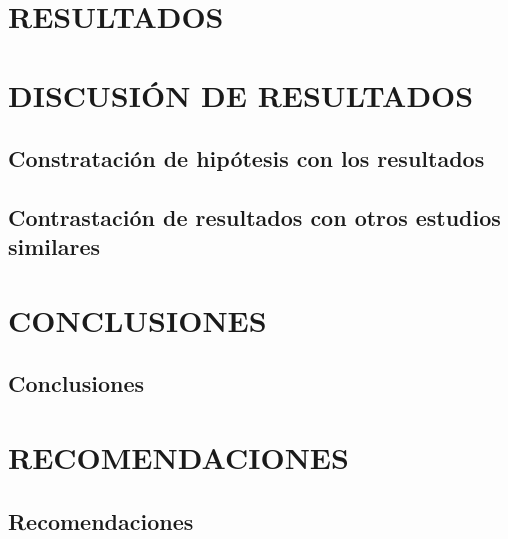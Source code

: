 \documentclass[12pt,a4paper,oneside]{report}
\begin{document}
\chapter{RESULTADOS}


\chapter{DISCUSIÓN DE RESULTADOS}

\section{Constratación de hipótesis con los resultados}

\section{Contrastación de resultados con otros estudios similares}


\chapter{ CONCLUSIONES}

\section{Conclusiones}



\chapter{\hspace{0.23cm}RECOMENDACIONES}

\section{Recomendaciones}
\end{document}
